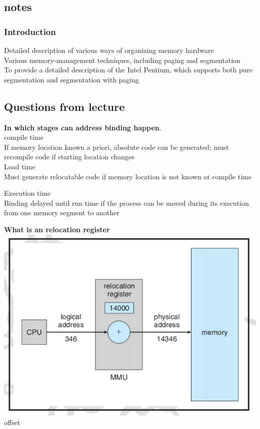 \documentclass[a4paper,10pt,titlepage]{report}
\begin{document}
\subsection{notes}
\subsubsection{Introduction}
Detailed description of various ways of organizing memory hardware\\
Various memory-management techniques, including paging and segmentation \\
To provide a detailed description of the Intel Pentium, which supports both pure segmentation and
segmentation with paging \\

\subsection{Questions from lecture}
\textbf{In which stages can address binding happen}.\\
\hspace{10mm} compile time \\
\hspace{15mm} If memory location known a priori, absolute code can be generated; must recompile code if starting location changes \\



\hspace{10mm} Load time\\
\hspace{15mm} Must generate relocatable code if memory location is not known at compile time



\hspace{10mm} Execution time \\
\hspace{15mm} Binding delayed until run time if the process can be moved during its execution from one memory segment to another \\

\vspace{5mm}

\textbf{What is an relocation register}\\
\includegraphics[scale=0.5]{relocation.png}
offset
\end{document}

